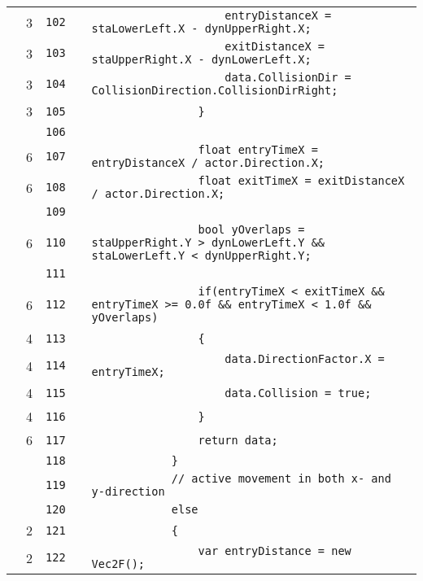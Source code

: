 \documentclass[a4paper,landscape,10pt]{article}
\begin{document}
\begin{longtable}[l]{lrrll}
\cellcolor{green} & 3 & \verb~102~ & & \verb~                    entryDistanceX = staLowerLeft.X - dynUpperRight.X;~\\
\cellcolor{green} & 3 & \verb~103~ & & \verb~                    exitDistanceX = staUpperRight.X - dynLowerLeft.X;~\\
\cellcolor{green} & 3 & \verb~104~ & & \verb~                    data.CollisionDir = CollisionDirection.CollisionDirRight;~\\
\cellcolor{green} & 3 & \verb~105~ & & \verb~                }~\\
\cellcolor{gray} &  & \verb~106~ & & \verb~~\\
\cellcolor{green} & 6 & \verb~107~ & & \verb~                float entryTimeX = entryDistanceX / actor.Direction.X;~\\
\cellcolor{green} & 6 & \verb~108~ & & \verb~                float exitTimeX = exitDistanceX / actor.Direction.X;~\\
\cellcolor{gray} &  & \verb~109~ & & \verb~~\\
\cellcolor{orange} & 6 & \verb~110~ & & \verb~                bool yOverlaps = staUpperRight.Y > dynLowerLeft.Y && staLowerLeft.Y < dynUpperRight.Y;~\\
\cellcolor{gray} &  & \verb~111~ & & \verb~~\\
\cellcolor{green} & 6 & \verb~112~ & & \verb~                if(entryTimeX < exitTimeX && entryTimeX >= 0.0f && entryTimeX < 1.0f && yOverlaps)~\\
\cellcolor{green} & 4 & \verb~113~ & & \verb~                {~\\
\cellcolor{green} & 4 & \verb~114~ & & \verb~                    data.DirectionFactor.X = entryTimeX;~\\
\cellcolor{green} & 4 & \verb~115~ & & \verb~                    data.Collision = true;~\\
\cellcolor{green} & 4 & \verb~116~ & & \verb~                }~\\
\cellcolor{green} & 6 & \verb~117~ & & \verb~                return data;~\\
\cellcolor{gray} &  & \verb~118~ & & \verb~            }~\\
\cellcolor{gray} &  & \verb~119~ & & \verb~            // active movement in both x- and y-direction~\\
\cellcolor{gray} &  & \verb~120~ & & \verb~            else~\\
\cellcolor{green} & 2 & \verb~121~ & & \verb~            {~\\
\cellcolor{green} & 2 & \verb~122~ & & \verb~                var entryDistance = new Vec2F();~\\

\end{longtable}
\end{document}
